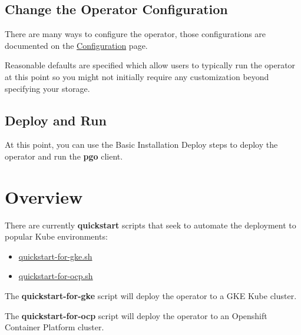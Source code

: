 \documentclass[letterpaper,12pt]{article}
\let\stdsection\section
\renewcommand\section{\newpage\stdsection}
\begin{document}
\subsection{Change the Operator Configuration}\label{/_custom_installation/_change_the_operator_configuration}

There are many ways to configure the operator, those configurations are documented on the \href{docs/configuration.asciidoc}{Configuration} page.

Reasonable defaults are specified which allow users to typically run the operator at this point so you might not initially require any customization beyond specifying your storage.

\subsection{Deploy and Run}\label{/_custom_installation/_deploy_and_run}

At this point, you can use the Basic Installation Deploy steps to deploy the operator and run the \textbf{pgo} client.
\section{Overview}\label{/_overview}

There are currently \textbf{quickstart} scripts that seek to automate the deployment to popular Kube environments:

\begin{itemize}
    \item \href{../examples/quickstart-for-gke.sh}{quickstart-for-gke.sh} 
    \item \href{../examples/quickstart-for-ocp.sh}{quickstart-for-ocp.sh} 
\end{itemize}
The \textbf{quickstart-for-gke} script will deploy the operator to a GKE Kube cluster.

The \textbf{quickstart-for-ocp} script will deploy the operator to an Openshift Container Platform cluster.
\end{document}
